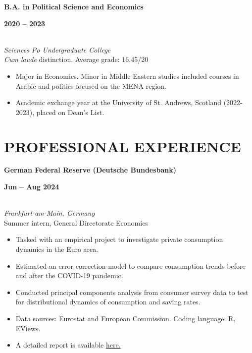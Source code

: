 \documentclass[a4paper,9pt]{extarticle}
\begin{document}
\noindent
\begin{minipage}[t]{0.7\textwidth}
  \textbf{B.A. in Political Science and Economics}
\end{minipage}%
\begin{minipage}[t]{0.3\textwidth}
  \raggedleft \textbf{2020 -- 2023}
\end{minipage}
\\
\textit{Sciences Po Undergraduate College} \\
\textit{Cum laude} distinction. Average grade: 16,45/20
\begin{itemize}[noitemsep, topsep=0pt, left=0.65cm]
    \item Major in Economics. Minor in Middle Eastern studies included courses in Arabic and politics focused on the MENA region. 
    \item Academic exchange year at the University of St. Andrews, Scotland (2022-2023), placed on Dean's List. \\
\end{itemize} 


\section*{PROFESSIONAL EXPERIENCE}

\noindent
\newline
\begin{minipage}[t]{0.7\textwidth}
  \textbf{German Federal Reserve (Deutsche Bundesbank)}
\end{minipage}%
\begin{minipage}[t]{0.3\textwidth}
  \raggedleft \textbf{Jun -- Aug 2024}
\end{minipage}
\\
\textit{Frankfurt-am-Main, Germany} \\ 
Summer intern, General Directorate Economics 
\begin{itemize}[noitemsep, topsep=0pt, left=0.65cm]
    \item Tasked with an empirical project to investigate private consumption dynamics in the Euro area.
    \item Estimated an error-correction model to compare consumption trends before and after the COVID-19 pandemic.
    \item Conducted principal components analysis from consumer survey data to test for distributional dynamics of consumption and saving rates.
    \item Data sources: Eurostat and European Commission. Coding language: R, EViews.
    \item A detailed report is available \href{https://lionelchambon.github.io/files/Chambon_BundesbankProject_EN.pdf}{here.}
    \\
\end{itemize}
\end{document}
